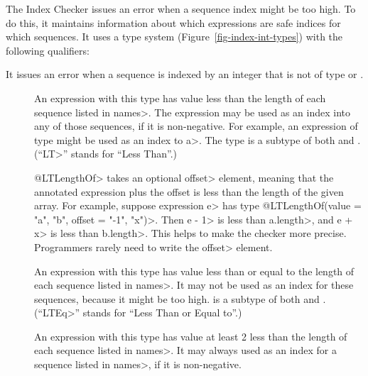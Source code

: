 The Index Checker issues an error when a sequence index might be
too high. To do this, it maintains information about which expressions are
safe indices for which sequences.
It uses a type system (Figure~\ref{fig-index-int-types}) with the following
qualifiers:

It issues an error when a sequence 
is indexed by an integer that is not of type 
or .

\begin{description}

\item[]
  An expression with this type
  has value less than the length of each sequence listed in \<names>.
  The expression may be used as an index into any of those sequences,
  if it is non-negative.
  For example, an expression of type  might be
  used as an index to \<a>.
  The type  is a subtype of both
   and .
  (``\<LT>'' stands for ``Less Than''.)

  \<@LTLengthOf> takes an optional \<offset> element, meaning that the
  annotated expression plus the offset is less than the length of the given
  array.  For example, suppose expression \<e> has type \<@LTLengthOf(value
  = {"a", "b"}, offset = {"-1", "x"})>. Then \<e - 1> is less than
  \<a.length>, and \<e + x> is less than \<b.length>.  This helps to make
  the checker more precise.  Programmers rarely need to write the \<offset>
  element.

\item[]
  An expression with this type
  has value less than or equal to the length of each sequence listed in \<names>.
  It may not be used as an index for these sequences, because it might be too high.
   is a subtype of both
   and .
  (``\<LTEq>'' stands for ``Less Than or Equal to''.)

\item[]
  An expression with this type
  has value at least 2 less than the length of each sequence listed in \<names>.
  It may always used as an index for a sequence listed in \<names>, if it is
  non-negative.


\end{description}
